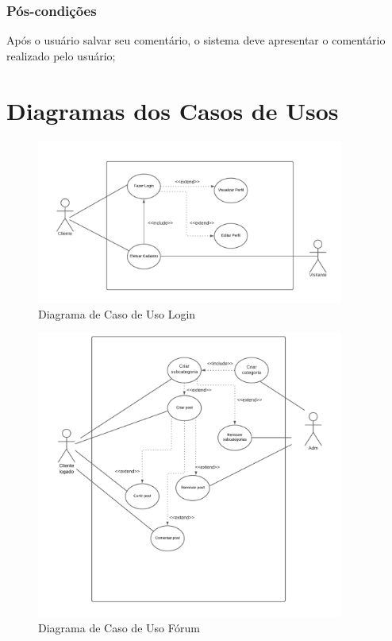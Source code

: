 \subsection{Pós-condições}
Após o usuário salvar seu comentário, o sistema deve apresentar o comentário realizado pelo usuário; 


\chapter{Diagramas dos Casos de Usos}
\begin{figure}[htb]

    \centering
	\caption{\label{fig_arq_virado}Diagrama de Caso de Uso Login}
	\includegraphics[width=0.9\textwidth]{anexos/diagramaLogin.png}

	\end{figure}
\begin{figure}[htb]

    \centering
	\caption{\label{fig_arq_virado}Diagrama de Caso de Uso Fórum}
	\includegraphics[width=0.9\textwidth]{anexos/diagramaForum.png}

	\end{figure}
